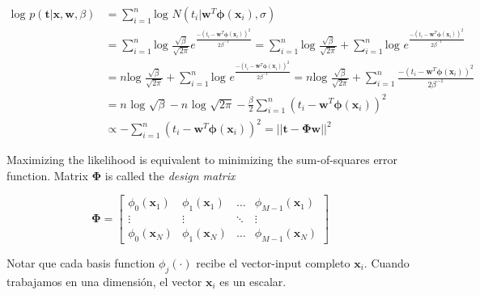 \begin{equation}\label{eq:maximum_likelihood}
 \begin{split}
   \text{log } p(\bm{t} | \bm{x}, \bm{w}, \beta) & = \sum_{i=1}^{n} \text{log } N(t_i | \bm{w}^T \bm{\phi}(\bm{x}_i), \sigma)  \\
  & =  \sum_{i=1}^{n} \text{log }  \frac{\sqrt{\beta} }{\sqrt{2\pi}} e^{\frac{-(t_i - \bm{w}^T\bm{\phi}(\bm{x}_i))^2}{2\beta^{-1}} } = \sum_{i=1}^{n} \text{log } \frac{\sqrt{\beta} }{\sqrt{2\pi}} + \sum_{i=1}^{n} \text{log } e^{\frac{-(t_i - \bm{w}^T\bm{\phi}(\bm{x}_i))^2}{2\beta^{-1}} } \\
  & = n \text{log } \frac{\sqrt{\beta} }{\sqrt{2\pi}} + \sum_{i=1}^{n} \text{log } e^{\frac{-(t_i - \bm{w}^T\bm{\phi}(\bm{x}_i))^2}{2\beta^{-1}} } = n \text{log } \frac{\sqrt{\beta} }{\sqrt{2\pi}} + \sum_{i=1}^{n}  \frac{-(t_i - \bm{w}^T\bm{\phi}(\bm{x}_i))^2}{2\beta^{-1}} \\
   &  = n \text{ log } \sqrt{\beta} - n \text{ log } \sqrt{2\pi} - \frac{\beta}{2} \sum_{i=1}^{n}  (t_i - \bm{w}^T\bm{\phi}(\bm{x}_i))^2   \\
  & \propto  - \sum_{i=1}^{n}  (t_i - \bm{w}^T\bm{\phi}(\bm{x}_i))^2 = ||\bm{t}-\bm{\Phi}\bm{w}||^2
 \end{split}
\end{equation}

Maximizing the likelihood is equivalent to minimizing the sum-of-squares error function.
Matrix $\bm{\Phi}$ is called the \emph{design matrix}

\begin{equation}
 \bm{\Phi} =
  \begin{bmatrix}
    \phi_0(\bm{x}_1) & \phi_1(\bm{x}_1) & \dots & \phi_{M-1}(\bm{x}_1)\\
    \vdots & \vdots & \ddots & \vdots \\
    \phi_0(\bm{x}_N) & \phi_1(\bm{x}_N) & \dots & \phi_{M-1}(\bm{x}_N)
  \end{bmatrix}
\end{equation}

Notar que cada basis function $\phi_j(\cdot)$ recibe el vector-input completo $\bm{x}_i$.
Cuando trabajamos en una dimensi\'on, el vector $\bm{x}_i$ es un escalar.



% 



